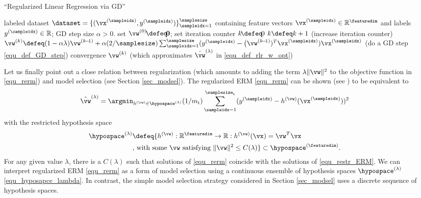 \documentclass[12pt]{report}
\begin{document}
\begin{algorithm}[htbp]
\caption{``Regularized Linear Regression via GD''}\label{alg:gd_reglinreg}
\begin{algorithmic}[1]
\renewcommand{\algorithmicrequire}{\textbf{Input:}}
\renewcommand{\algorithmicensure}{\textbf{Output:}}
\Require   labeled dataset $\dataset=\{ (\vx^{(\sampleidx)}, y^{(\sampleidx)}) \}_{\sampleidx=1}^{\samplesize}$ containing feature vectors 
$\vx^{(\sampleidx)} \in \mathbb{R}^{\featuredim}$ and labels $y^{(\sampleidx)} \in \mathbb{R}$; GD step size $\alpha >0$. 
\Statex\hspace{-6mm}{\bf Initialize:}set $\vw^{(0)}\!\defeq\!\mathbf{0}$; set iteration counter $k\!\defeq\!0$   
\Repeat 
\State $k \defeq k +1$    (increase iteration counter) 
\State  $\vw^{(k)} \defeq (1- \alpha \lambda) \vw^{(k\!-\!1)} + \alpha (2/\samplesize) \sum_{\sampleidx=1}^{\samplesize} (y^{(\sampleidx)} - \big(\vw^{(k\!-\!1)})^{T} \vx^{(\sampleidx)}) \vx^{(\sampleidx)}$  (do a GD step \eqref{equ_def_GD_step})
\Until convergence 
\Ensure $\vw^{(k)}$ (which approximates $\hat{\vw}^{(\lambda)}$ in \eqref{equ_def_rlr_w_opt})
\end{algorithmic}
\end{algorithm}

Let us finally point out a close relation between regularization (which amounts to 
adding the term $\lambda \| \vw \|^{2}$ to the objective function in \eqref{equ_rerm}) 
and model selection (see Section \ref{sec_modsel}). The regularized ERM \eqref{equ_rerm} 
can be shown (see \cite[Ch. 5]{BertsekasNonLinProgr}) to be equivalent to 
\begin{equation} 
\label{equ_restr_ERM}
\hat{\vw}^{(\lambda)} = \argmin_{h^{(\vw)} \in \hypospace^{(\lambda)}}  (1/m_{\rm t}) \sum_{\sampleidx=1}^{\samplesize_{\rm t}}  (y^{(\sampleidx)} - h^{(\vw)}(\vx^{(\sampleidx)})  )^2
\end{equation}  
with the restricted hypothesis space
\begin{align} 
\label{equ_hyposapce_lambda}
\hypospace^{(\lambda)} & \defeq \{ h^{(\vw)}: \mathbb{R}^{\featuredim} \rightarrow \mathbb{R}: h^{(\vw)}(\vx) = \vw^{T} \vx \nonumber \\
& \mbox{, with some } \vw \mbox{ satisfying } \| \vw \|^{2} \leq C(\lambda) \} \subset \hypospace^{(\featuredim)}. 
\end{align} 
For any given value $\lambda$, there is a $C(\lambda)$ such that 
solutions of \eqref{equ_rerm} coincide with the solutions of \eqref{equ_restr_ERM}. 
We can interpret regularized ERM \eqref{equ_rerm} as a form of model selection using 
a continuous ensemble of hypothesis spaces $\hypospace^{(\lambda)}$ \eqref{equ_hyposapce_lambda}. 
In contrast, the simple model selection strategy considered in Section \ref{sec_modsel} 
uses a discrete sequence of hypothesis spaces.   
\end{document}
